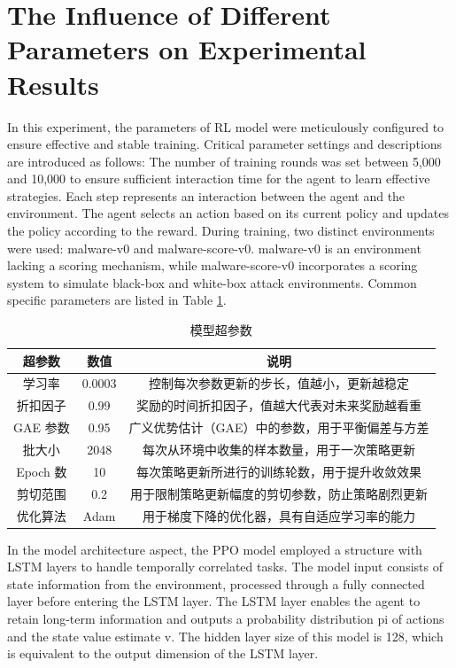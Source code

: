 \section{The Influence of Different Parameters on Experimental Results}

In this experiment, the parameters of RL model were meticulously configured to ensure effective and stable training. Critical parameter settings and descriptions are introduced as follows: The number of training rounds was set between 5,000 and 10,000 to ensure sufficient interaction time for the agent to learn effective strategies. Each step represents an interaction between the agent and the environment. The agent selects an action based on its current policy and updates the policy according to the reward. During training, two distinct environments were used: malware-v0 and malware-score-v0. malware-v0 is an environment lacking a scoring mechanism, while malware-score-v0 incorporates a scoring system to simulate black-box and white-box attack environments. Common specific parameters are listed in Table \ref{tab:5.5}.

\begin{table}[htbp]
	\centering
	\caption{模型超参数}
	\label{tab:5.5}
    \begin{tabular*}{0.9\textwidth}{@{\extracolsep{\fill}}ccc}
    \toprule
		超参数 & 数值 & 说明 \\
    \midrule
		学习率 & 0.0003 & 控制每次参数更新的步长，值越小，更新越稳定 \\
		折扣因子 & 0.99 & 奖励的时间折扣因子，值越大代表对未来奖励越看重 \\
		GAE 参数 & 0.95 & 广义优势估计（GAE）中的参数，用于平衡偏差与方差 \\
		批大小 & 2048 & 每次从环境中收集的样本数量，用于一次策略更新 \\
		Epoch 数 & 10 & 每次策略更新所进行的训练轮数，用于提升收敛效果 \\
		剪切范围 & 0.2 & 用于限制策略更新幅度的剪切参数，防止策略剧烈更新\\
		优化算法 & Adam & 用于梯度下降的优化器，具有自适应学习率的能力 \\
    \bottomrule
	\end{tabular*}
\end{table}

In the model architecture aspect, the PPO model employed a structure with LSTM layers to handle temporally correlated tasks. The model input consists of state information from the environment, processed through a fully connected layer before entering the LSTM layer. The LSTM layer enables the agent to retain long-term information and outputs a probability distribution pi of actions and the state value estimate v. The hidden layer size of this model is 128, which is equivalent to the output dimension of the LSTM layer.

